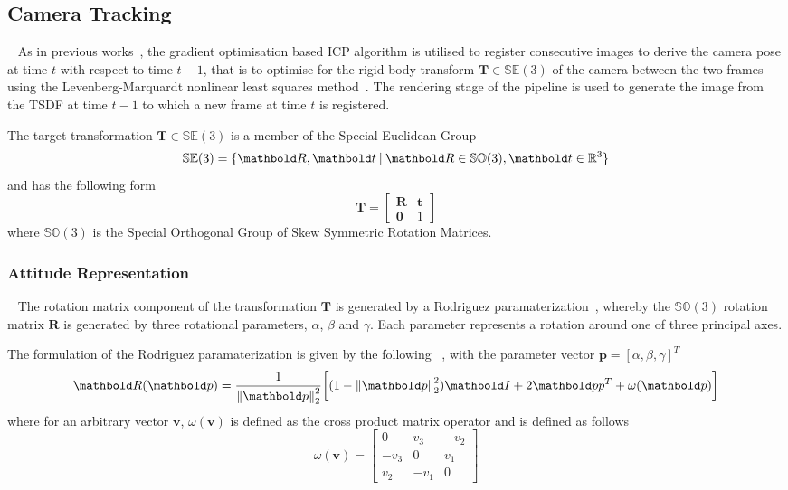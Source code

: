 \subsection{Camera Tracking}
~\label{subsec:moseg_static_camera_tracking}
As in previous works~\cite{Newcombe2011, Prisacariu2014}, the gradient
optimisation based ICP algorithm is utilised to register consecutive images
to derive the camera pose at time \(t\) with respect to time \(t-1\), that is to
optimise for the rigid body transform \(\bm{T} \in \mathbb{SE}(3)\) of the
camera between the two frames using the Levenberg-Marquardt nonlinear least
squares method~\cite{NumericalRecipes}. The rendering stage of the pipeline
is used to generate the image from the TSDF at time \(t-1\) to which a new frame
at time \(t\) is registered.

The target transformation \(\bm{T} \in \mathbb{SE}(3)\) is a member of the
Special Euclidean Group
\begin{equation}
  \label{eqn:se3_definition}
  \mathbb{SE}(3) = \{\bm{R}, \bm{t} \given \bm{R} \in
  \mathbb{SO}(3), \bm{t} \in \mathbb{R}^{3}\}
\end{equation}
and has the following form
\begin{equation}
  \label{eqn:trans_mat_definition}
  \bm{T} =
  \begin{bmatrix}
    \bm{R} & \bm{t} \\
    \bm{0} & 1
  \end{bmatrix}
\end{equation}
where \(\mathbb{SO}(3)\) is the Special Orthogonal Group of Skew Symmetric
Rotation Matrices.

\subsubsection{Attitude Representation}
~\label{subsub:moseg_static_camera_attitude}
The rotation matrix component of the transformation \(\bm{T}\) is
generated by a Rodriguez paramaterization~\cite{Shuster1993}, whereby the
\(\mathbb{SO}(3)\) rotation matrix \(\bm{R}\) is generated by three rotational
parameters, \( \alpha \), \( \beta \) and \( \gamma \). Each parameter represents a 
rotation around one of three principal axes.

The formulation of the Rodriguez paramaterization is given by the following 
~\cite{Shuster1993}, with the parameter vector
\(\bm{p} = {[\alpha, \beta, \gamma]}^{T}\)
\begin{equation}
  \label{eqn:rodriguez_matrix_eq}
  \bm{R}(\bm{p}) =
  \frac{1}{\norm{\bm{p}}^{2}}
  \bigg[
  (1 - \norm{\bm{p}}^{2})\bm{I} +
  2 \bm{pp}^{T} + \omega(\bm{p})
  \bigg]
\end{equation}
where for an arbitrary vector \(\bm{v}\), \(\omega(\bm{v})\) is defined as
the cross product matrix operator and is defined as follows
\begin{equation}
  \label{eqn:cross_prod_mat}
  \omega(\bm{v}) =
  \begin{bmatrix}
    0 & v_{3} & -v_{2} \\
    -v_{3} & 0 & v_{1} \\
    v_{2} & -v_{1} & 0
  \end{bmatrix}
\end{equation}

